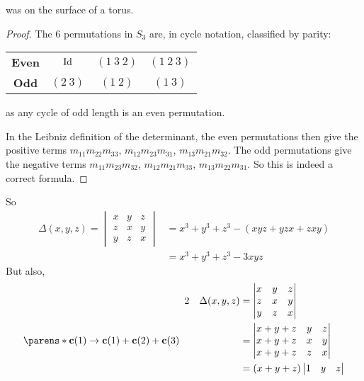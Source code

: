 \documentclass[fleqn,a4paper,11pt]{article}
\begin{document}
\begin{enumerate}[label=\textbf{\arabic*.}]
\begin{lemma}
    was on the surface of a torus.
   \end{lemma}
   \begin{proof}
    The \(6\) permutations in \(S_3\) are, in cycle notation, classified by
    parity:
    \begin{center}
     \begin{tabular}{*4c}
      \bfseries Even & \(\operatorname{Id}\) & \((1\ 3\ 2)\) & \((1\ 2\ 3)\) \\
      \bfseries Odd & \((2\ 3)\) & \((1\ 2)\) & \((1\ 3)\)
     \end{tabular}
    \end{center}
    as any cycle of odd length is an even permutation.

    In the Leibniz definition of the determinant, the even permutations
    then give the positive terms
    \({m_{11} m_{22} m_{33}}\),
    \({m_{12} m_{23} m_{31}}\),
    \({m_{13} m_{21} m_{32}}\).
    The odd permutations give the negative terms
    \(m_{11} m_{23} m_{32}\),
    \(m_{12} m_{21} m_{33}\),
    \(m_{13} m_{22} m_{31}\). So this is indeed a correct formula.
   \end{proof}
   So
   \begin{align*}
    \Delta(x, y, z) =
    \begin{vmatrix}
     x & y & z \\
     z & x & y \\
     y & z & x
    \end{vmatrix}
     &= x^3 + y^3 + z^3 - (xyz + yzx + zxy) \\
     &= x^3 + y^3 + z^3 - 3xyz
   \end{align*}
   But also,
   \begin{alignat*}2
    && \Delta(x, y, z) &= \begin{vmatrix}
     x & y & z \\
     z & x & y \\
     y & z & x
    \end{vmatrix} \\
    \parens*{
     \vec c(1) \to \vec c(1) + \vec c(2) + \vec c(3)
    } \quad
    && &= \begin{vmatrix}
     x + y + z & y & z \\
     x + y + z & x & y \\
     x + y + z & z & x
    \end{vmatrix} \\
    && &= (x + y + z)\begin{vmatrix}
     1 & y & z \\

\end{vmatrix}
\end{alignat*}
\end{enumerate}
\end{document}
